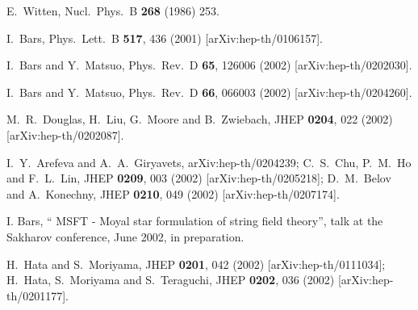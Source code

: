 \documentclass[a4paper,11pt]{article}
\begin{document}
\begin{thebibliography}{99}
{\small %
}

 {\small E.~Witten,
Nucl.\ Phys.\ B \textbf{268} (1986) 253. %
}

 {\small I.~Bars, %
Phys.\ Lett.\ B \textbf{517}, 436 (2001) [arXiv:hep-th/0106157].
}

 {\small I.~Bars and Y.~Matsuo,
Phys.\ Rev.\ D \textbf{65}, 126006 (2002) [arXiv:hep-th/0202030].
}

 {\small I.~Bars and Y.~Matsuo,
Phys.\ Rev.\ D \textbf{66}, 066003 (2002) [arXiv:hep-th/0204260].
}

{\small %
}

 {\small M.~R.~Douglas, H.~Liu, G.~Moore and B.~Zwiebach,
JHEP \textbf{0204}, 022 (2002) [arXiv:hep-th/0202087]. }

 {\small %
I.~Y.~Arefeva and A.~A.~Giryavets,
arXiv:hep-th/0204239;\newline
%
%
C.~S.~Chu, P.~M.~Ho and F.~L.~Lin,
JHEP \textbf{0209}, 003 (2002) [arXiv:hep-th/0205218];\newline
%
%
D.~M.~Belov and A.~Konechny,
JHEP \textbf{0210}, 049 (2002) [arXiv:hep-th/0207174].
}

 {\small I. Bars, `` MSFT - Moyal star formulation of
string field theory'', talk at the Sakharov conference, June 2002, in
preparation. }

 {\small %
H.~Hata and S.~Moriyama,
JHEP \textbf{0201}, 042 (2002) [arXiv:hep-th/0111034];\newline
H.~Hata, S.~Moriyama and S.~Teraguchi, %
JHEP \textbf{0202}, 036 (2002) [arXiv:hep-th/0201177].
}


\end{thebibliography}
\end{document}
